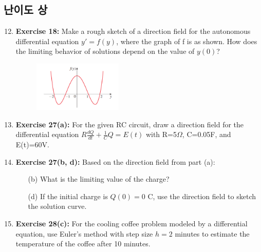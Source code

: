 \documentclass[12pt, a4paper]{article}
\begin{document}
\subsection*{난이도 상}
\begin{enumerate}
    \setcounter{enumi}{11} %
    \item \textbf{Exercise 18:} Make a rough sketch of a direction field for the autonomous differential equation $y' = f(y)$, where the graph of f is as shown. How does the limiting behavior of solutions depend on the value of $y(0)$?
    
    \begin{center}
        \begin{figure}[htbp] %
            \centering %
             \includegraphics[width=0.4\textwidth]{graph4.png} %
         \end{figure}
    \end{center}

    \item \textbf{Exercise 27(a):} For the given RC circuit, draw a direction field for the differential equation $R\frac{dQ}{dt}+\frac{1}{C}Q=E(t)$ with R=5$\Omega$, C=0.05F, and E(t)=60V.

    \item \textbf{Exercise 27(b, d):} Based on the direction field from part (a):
    \begin{itemize}
        \item[(b)] What is the limiting value of the charge?
        \item[(d)] If the initial charge is $Q(0)=0$ C, use the direction field to sketch the solution curve.
    \end{itemize}

    \item \textbf{Exercise 28(c):} For the cooling coffee problem modeled by a differential equation, use Euler's method with step size $h=2$ minutes to estimate the temperature of the coffee after 10 minutes.
\end{enumerate}
\end{document}
